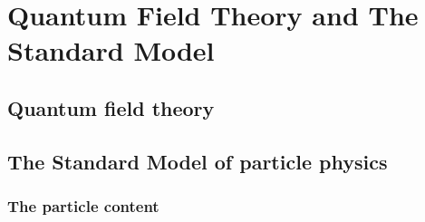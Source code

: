 \chapter{Quantum Field Theory and The Standard Model}

\section{Quantum field theory}

\section{The Standard Model of particle physics}
\subsection{The particle content}

